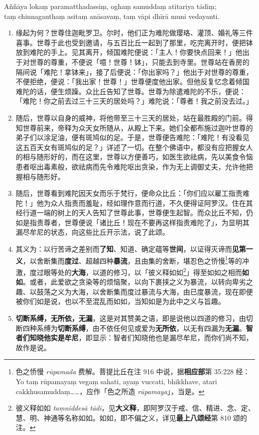 Aññāya lokaṃ paramatthadassiṃ, oghaṃ samuddaṃ atitariya tādiṃ;\\
taṃ chinnaganthaṃ asitaṃ anāsavaṃ, taṃ vāpi dhīrā muni vedayanti. %

\begin{enumerate}\item 缘起为何？世尊住迦毗罗卫。尔时，他们正为难陀做璎珞、灌顶、婚礼等三件喜事。世尊于此也受到邀请，与五百比丘一起到了那里，吃完离开时，便把钵放到难陀的手上。见其离开，倾国难陀便说：「主人！你要快点回来！」他出于对世尊的尊重，不便说「噫！世尊！钵」，只能去到寺里。世尊站在香房的隔间说「难陀！拿钵来」，接了后便说：「你出家吗？」他出于对世尊的尊重，不便拒绝，便说：「我出家！世尊！」世尊便度他出家。但他反复忆念着倾国难陀的话，便生烦躁。众比丘告知了世尊。世尊为除遣难陀的不乐，便说：「难陀！你之前去过三十三天的居处吗？」难陀说：「尊者！我之前没去过。」
\item 随后，世尊以自身的威神，将他带至三十三天的居处，站在最胜殿的门前。得知世尊前来，帝释为众天女所随从，从殿上下来。她们全都布施过迦叶世尊的弟子们以涂足油，便有斑鸠似的足。于是，世尊便告难陀：「难陀！有没看见这五百天女有斑鸠似的足？」详述了一切。在整个佛语中，都没有应把握女人的相与随形好的，而在这里，世尊以方便善巧，如医生欲祛病，先以美食令恼患者呕出毒素般，欲祛病而先令难陀呕出贪染，作为无上调御丈夫，允许他把握相与随形好。
\item 随后，世尊看到难陀因天女而乐于梵行，便命众比丘：「你们应以雇工指责难陀！」他为众人指责而羞耻，经如理作意而行道，不久便得证阿罗汉。住在其经行道一端的树上的天人告知了世尊此事，世尊便生起智。而众比丘不知，仍如是指责尊者，世尊便说「诸比丘！现在不要再这样指责难陀了」，为显明其漏尽牟尼的状态，向这些比丘开示法，说了此颂。
\item 其义为：以行苦谛之差别而\textbf{了知}、知道、确定蕴等\textbf{世间}，以证得灭谛而\textbf{见第一义}，以舍断集而\textbf{度过}、超越四种\textbf{暴流}，且由集的舍断，堪忍色之㤭慢\footnote{色之㤭慢 \textit{rūpamada} 费解。菩提比丘在注 916 中说，据\textbf{相应部}第 35:228 经：Yo taṃ rūpamayaṃ vegaṃ sahati, ayaṃ vuccati, bhikkhave, atari cakkhusamuddaṃ……，应作「色之所造 \textit{rūpamaya}」，当是。}等的冲激，度过眼等处的\textbf{大海}，以道的修习，以「彼义释如如\footnote{彼义释如如 \textit{taṃniddesā tādī}，见\textbf{大义释}，即阿罗汉于戒、信、精进、念、定、慧、明、神通等名称如如。如如，即不偏之义，详见\textbf{最上八颂经}第 810 颂的注。}」得至如如之相而\textbf{如如}。或者，此爱欲之贪染等的烦恼聚，以向下裹挟之义为暴流，以转向卑劣之趣、以鼓荡之义为大海，以舍断集而度过暴流与大海，由已度暴流，现在即便被你们如是说，也以不至混乱而如如，当知如是为此中之义与旨趣。
\item \textbf{切断系缚，无所依，无漏}，这是对其赞美之语，即是说他以四道的修习，由切断四种系缚为\textbf{切断系缚}，由不依任何见或爱为\textbf{无所依}，以无有四漏为\textbf{无漏}。\textbf{智者们知晓他实是牟尼}，即显示：智者们知晓他也是漏尽牟尼，而你们尚不知，故作是说。\end{enumerate}

